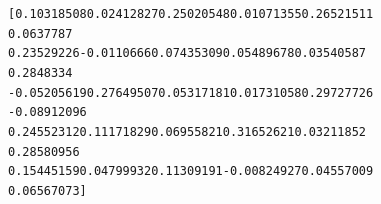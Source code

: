 \documentclass[letterpaper,10pt,english]{/usr/share/sphinx/texinputs/sphinxhowto}
\newenvironment{InvisibleVerbatim}
        {\begin{mdframed}[leftmargin=0.1\linewidth,innerleftmargin=3pt,innerrightmargin=3pt, userdefinedwidth=1\linewidth, linewidth=0pt, linecolor=white, usetwoside=false]}
        {\end{mdframed}}
\begin{document}
            
                \begin{InvisibleVerbatim}
                \vspace{-0.5\baselineskip}
\begin{alltt}[ 0.10318508  0.02412827  0.25020548  0.01071355  0.26521511
0.0637787
  0.23529226 -0.0110666   0.07435309  0.05489678  0.03540587
0.2848334
 -0.05205619  0.27649507  0.05317181  0.01731058  0.29727726
-0.08912096
  0.24552312  0.11171829  0.06955821  0.31652621  0.03211852
0.28580956
  0.15445159  0.04799932  0.11309191 -0.00824927  0.04557009
0.06567073]
\end{alltt}

            \end{InvisibleVerbatim}
            
        
    

        

        \renewcommand{\indexname}{Index}
        \printindex

    
\end{document}
